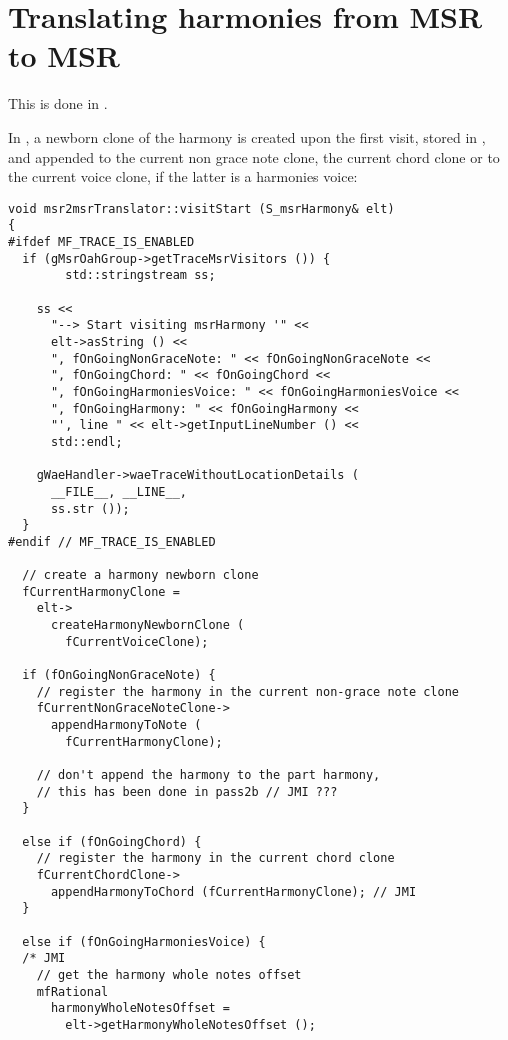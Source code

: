 \section{Translating harmonies from MSR to MSR}

This is done in \msrToMsr{}.

In , a newborn clone of the harmony is created upon the first visit, stored in , and appended to the current non grace note clone, the current chord clone or to the current voice clone, if the latter is a harmonies voice: %
\begin{lstlisting}[language=CPlusPlus]
void msr2msrTranslator::visitStart (S_msrHarmony& elt)
{
#ifdef MF_TRACE_IS_ENABLED
  if (gMsrOahGroup->getTraceMsrVisitors ()) {
		std::stringstream ss;

    ss <<
      "--> Start visiting msrHarmony '" <<
      elt->asString () <<
      ", fOnGoingNonGraceNote: " << fOnGoingNonGraceNote <<
      ", fOnGoingChord: " << fOnGoingChord <<
      ", fOnGoingHarmoniesVoice: " << fOnGoingHarmoniesVoice <<
      ", fOnGoingHarmony: " << fOnGoingHarmony <<
      "', line " << elt->getInputLineNumber () <<
      std::endl;

    gWaeHandler->waeTraceWithoutLocationDetails (
      __FILE__, __LINE__,
      ss.str ());
  }
#endif // MF_TRACE_IS_ENABLED

  // create a harmony newborn clone
  fCurrentHarmonyClone =
    elt->
      createHarmonyNewbornClone (
        fCurrentVoiceClone);

  if (fOnGoingNonGraceNote) {
    // register the harmony in the current non-grace note clone
    fCurrentNonGraceNoteClone->
      appendHarmonyToNote (
        fCurrentHarmonyClone);

    // don't append the harmony to the part harmony,
    // this has been done in pass2b // JMI ???
  }

  else if (fOnGoingChord) {
    // register the harmony in the current chord clone
    fCurrentChordClone->
      appendHarmonyToChord (fCurrentHarmonyClone); // JMI
  }

  else if (fOnGoingHarmoniesVoice) {
  /* JMI
    // get the harmony whole notes offset
    mfRational
      harmonyWholeNotesOffset =
        elt->getHarmonyWholeNotesOffset ();


\end{lstlisting}
